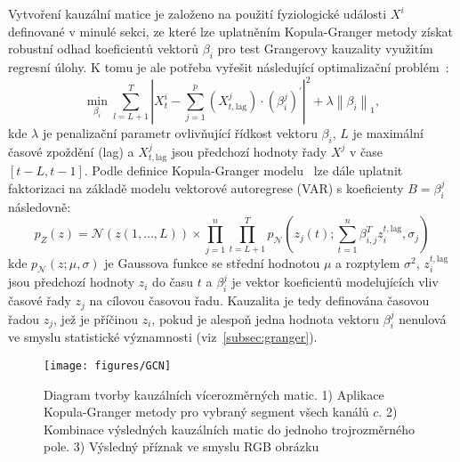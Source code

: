 Vytvoření kauzální matice je založeno na použití fyziologické události $X^i$
definované v minulé sekci, ze které lze uplatněním Kopula-Granger metody získat
robustní odhad koeficientů vektorů $\beta_i$ pro test Grangerovy kauzality
využitím regresní úlohy. K tomu je ale potřeba vyřešit následující optimalizační
problém~\cite{Schindler2013,Guy2016}:
\begin{equation}
    \min _{\beta_i} \sum_{l=L+1}^T\left|X_t^i-\sum_{j=1}^p\left(X_{t, \text {lag}}^j\right) \cdot\left(\beta_i^j\right)^{\prime}\right|^2+\lambda\left\|\beta_i\right\|_1,
\end{equation}
kde $\lambda$ je penalizační parametr ovlivňující řídkost vektoru $\beta_i$, $L$
je maximální časové zpoždění (lag) a ${X}_{t, \text {lag}}^j$ jsou předchozí
hodnoty řady $X^j$ v čase $[t - L, t - 1]$. Podle definice Kopula-Granger
modelu~\cite{Schindler2013,Guy2016} lze dále uplatnit faktorizaci na základě
modelu vektorové autoregrese (\gls{VAR}) s koeficienty $B = {{\beta}_{i}^j}$
následovně:
\begin{equation}
    p_Z(z)=\mathcal{N}(z(1, \ldots, L)) \times \prod_{j=1}^n \prod_{t=L+1}^T p_{\mathcal{N}}\left(z_j(t) ; \sum_{t=1}^n \beta_{i, j}^T z_i^{t, \text {lag}}, \sigma_j\right)
\end{equation}
kde $p_{\mathcal{N}}(z ; \mu, \sigma)$ je Gaussova funkce se střední hodnotou
$\mu$ a rozptylem $\sigma^2$, $z_i^{t, \text {lag}}$ jsou předchozí hodnoty
$z_i$ do času $t$ a ${\beta}_{i}^j$ je vektor koeficientů modelujících vliv
časové řady $z_j$ na cílovou časovou řadu. Kauzalita je tedy definována časovou
řadou $z_j$, jež je příčinou $z_i$, pokud je alespoň jedna hodnota vektoru
${\beta}_{i}^j$ nenulová ve smyslu statistické významnosti
(viz~\ref{subsec:granger}).

\begin{figure}[!htb]
    \begin{center}
        \texttt{[image: figures/GCN]}
        \caption{Diagram tvorby kauzálních vícerozměrných matic. 1) Aplikace
            Kopula-Granger metody pro vybraný segment všech kanálů $c$. 2) Kombinace
            výsledných kauzálních matic do jednoho trojrozměrného pole. 3) Výsledný
            příznak ve smyslu RGB obrázku}
        \label{fig:GCN}
    \end{center}
\end{figure}

